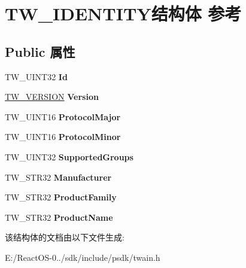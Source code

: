 \hypertarget{struct_t_w___i_d_e_n_t_i_t_y}{}\section{T\+W\+\_\+\+I\+D\+E\+N\+T\+I\+T\+Y结构体 参考}
\label{struct_t_w___i_d_e_n_t_i_t_y}
\subsection*{Public 属性}
\begin{DoxyCompactItemize}
\item 
\mbox{\label{struct_t_w___i_d_e_n_t_i_t_y_af7c2a1828ef7dbce91d1ad88cc82467a}} 
T\+W\+\_\+\+U\+I\+N\+T32 {\bfseries Id}
\item 
\mbox{\label{struct_t_w___i_d_e_n_t_i_t_y_a41f9219567895ae7b0c2b8f4daa1dabd}} 
\hyperlink{struct_t_w___v_e_r_s_i_o_n}{T\+W\+\_\+\+V\+E\+R\+S\+I\+ON} {\bfseries Version}
\item 
\mbox{\label{struct_t_w___i_d_e_n_t_i_t_y_ae354ca469ea391831bfbaaf385acdfb5}} 
T\+W\+\_\+\+U\+I\+N\+T16 {\bfseries Protocol\+Major}
\item 
\mbox{\label{struct_t_w___i_d_e_n_t_i_t_y_ae2de1aa6ad8efe6d68567a96c2fd8910}} 
T\+W\+\_\+\+U\+I\+N\+T16 {\bfseries Protocol\+Minor}
\item 
\mbox{\label{struct_t_w___i_d_e_n_t_i_t_y_ab491af470216250477e257153dfa4357}} 
T\+W\+\_\+\+U\+I\+N\+T32 {\bfseries Supported\+Groups}
\item 
\mbox{\label{struct_t_w___i_d_e_n_t_i_t_y_a43741c147ccdea24f57df24863dd5c92}} 
T\+W\+\_\+\+S\+T\+R32 {\bfseries Manufacturer}
\item 
\mbox{\label{struct_t_w___i_d_e_n_t_i_t_y_a894ef2aa381a44888ec5bf7a3958cc2a}} 
T\+W\+\_\+\+S\+T\+R32 {\bfseries Product\+Family}
\item 
\mbox{\label{struct_t_w___i_d_e_n_t_i_t_y_a4e3c2507fbbdaff9472c8316b38fd8d9}} 
T\+W\+\_\+\+S\+T\+R32 {\bfseries Product\+Name}
\end{DoxyCompactItemize}


该结构体的文档由以下文件生成\+:\begin{DoxyCompactItemize}
\item 
E\+:/\+React\+O\+S-\/0../sdk/include/psdk/twain.\+h\end{DoxyCompactItemize}
